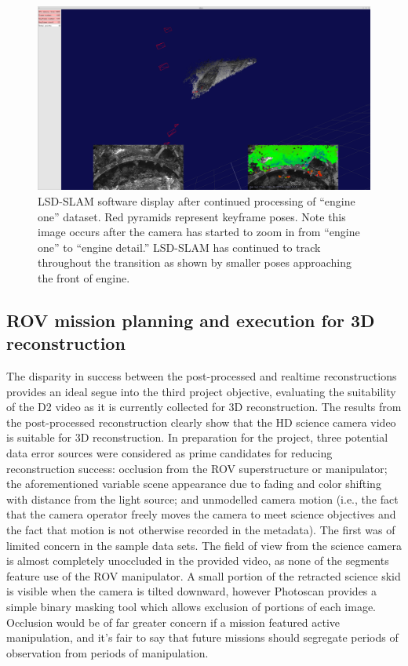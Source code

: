 \documentclass[letterpaper,12pt]{article}
\begin{document}
\begin{figure}
    \centering
    \includegraphics[width=\textwidth]{images/lsd_slam_engine.png}
    \caption{LSD-SLAM software display after continued processing of ``engine one'' dataset.  Red pyramids represent keyframe poses.   Note this image occurs after the camera has started to zoom in from ``engine one'' to ``engine detail.''  LSD-SLAM has continued to track throughout the transition as shown by smaller poses approaching the front of engine.}
    \label{fig:lsd_slam_engine_detail}
\end{figure}


 
 
\subsection{ROV mission planning and execution for 3D reconstruction}

The disparity in success between the post-processed and realtime reconstructions provides an ideal segue into the third project objective, evaluating the suitability of the D2 video as it is currently collected for 3D reconstruction.  The results from the post-processed reconstruction clearly show that the HD science camera video is suitable for 3D reconstruction.  In preparation for the project, three potential data error sources were considered as prime candidates for reducing reconstruction success:   occlusion from the ROV superstructure or manipulator; the aforementioned variable scene appearance due to fading and color shifting with distance from the light source; and unmodelled camera motion (i.e., the fact that the camera operator freely moves the camera to meet science objectives and the fact that motion is not otherwise recorded in the metadata).     The first was of limited concern in the sample data sets.    The field of view from the science camera is almost completely unoccluded in the provided video, as none of the segments feature use of the ROV manipulator.   A small portion of the retracted science skid is visible when the camera is tilted downward, however Photoscan provides a simple binary masking tool which allows exclusion of portions of each image.   Occlusion would be of far greater concern if a mission featured active manipulation, and it's fair to say that future missions should segregate periods of observation from periods of manipulation.
\end{document}
